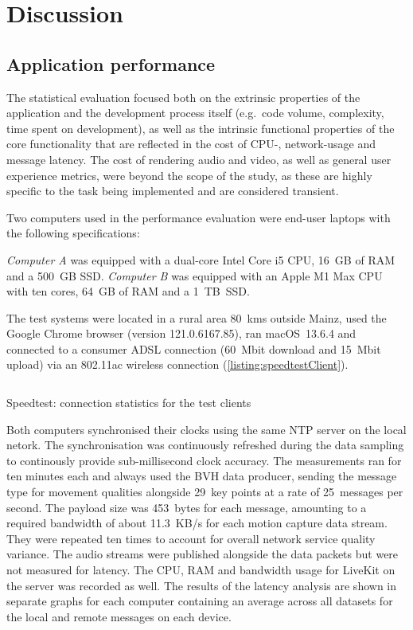 \chapter{Discussion}
\label{ch:discussion}


\section{Application performance}
\label{sec:statistics}

The statistical evaluation focused both on the extrinsic properties of the application and the development process itself (e.g.\ code volume, complexity, time spent on development), as well as the intrinsic functional properties of the core functionality that are reflected in the cost of \ac{CPU}-, network-usage and message latency.
The cost of rendering audio and video, as well as general user experience metrics, were beyond the scope of the study, as these are highly specific to the task being implemented and are considered transient.

Two computers used in the performance evaluation were end-user laptops with the following specifications:

\emph{Computer A} was equipped with a dual-core Intel Core i5 \ac{CPU}, 16~\ac{GB} of \ac{RAM} and a 500~\ac{GB} \ac{SSD}.
\emph{Computer B} was equipped with an Apple M1 Max \ac{CPU} with ten cores, 64~\ac{GB} of \ac{RAM} and a 1~\ac{TB}~\ac{SSD}.

The test systems were located in a rural area 80~\acp{km} outside Mainz, used the Google Chrome browser (version 121.0.6167.85), ran macOS~13.6.4 and connected to a consumer \ac{ADSL} connection (60~\ac{Mbit} download and 15~\ac{Mbit} upload) via an 802.11ac wireless connection (\autoref{listing:speedtestClient}).

\begin{listing}[!ht]
\inputminted{text}{04_Artefakte/03_Listings/speedtest-client.txt}
\caption{Speedtest: connection statistics for the test clients\protect}
\label{listing:speedtestClient}
\end{listing}

Both computers synchronised their clocks using the same \ac{NTP} server on the local netork.
The synchronisation was continuously refreshed during the data sampling to continously provide sub-millisecond clock accuracy.
The measurements ran for ten minutes each and always used the \ac{BVH} data producer, sending the message type for movement qualities alongside 29~key points at a rate of 25~messages per second.
The payload size was 453~bytes for each message, amounting to a required bandwidth of about 11.3~\ac{KB/s} for each motion capture data stream.
They were repeated ten times to account for overall network service quality variance.
The audio streams were published alongside the data packets but were not measured for latency.
The \ac{CPU}, \ac{RAM} and bandwidth usage for LiveKit on the server was recorded as well.
The results of the latency analysis are shown in separate graphs for each computer containing an average across all datasets for the local and remote messages on each device.

